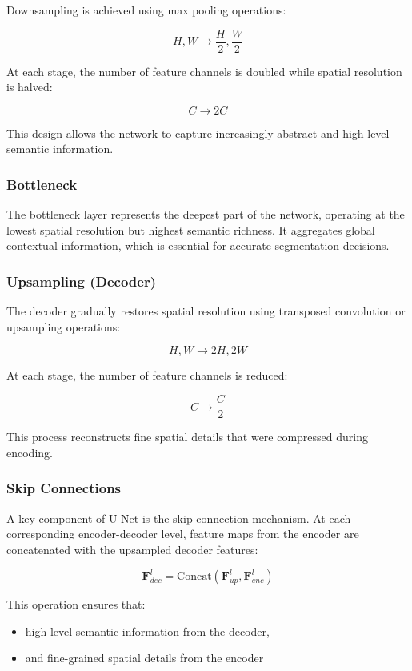 Downsampling is achieved using max pooling operations:

\[
H, W \rightarrow \frac{H}{2}, \frac{W}{2}
\]

At each stage, the number of feature channels is doubled while spatial resolution is halved:

\[
C \rightarrow 2C
\]

This design allows the network to capture increasingly abstract and high-level semantic information.

\subsubsection{Bottleneck}

The bottleneck layer represents the deepest part of the network, operating at the lowest spatial resolution but highest semantic richness. It aggregates global contextual information, which is essential for accurate segmentation decisions.

\subsubsection{Upsampling (Decoder)}

The decoder gradually restores spatial resolution using transposed convolution or upsampling operations:

\[
H, W \rightarrow 2H, 2W
\]

At each stage, the number of feature channels is reduced:

\[
C \rightarrow \frac{C}{2}
\]

This process reconstructs fine spatial details that were compressed during encoding.

\subsubsection{Skip Connections}

A key component of U-Net is the skip connection mechanism. At each corresponding encoder-decoder level, feature maps from the encoder are concatenated with the upsampled decoder features:

\[
\mathbf{F}_{dec}^{l} = \text{Concat}(\mathbf{F}_{up}^{l}, \mathbf{F}_{enc}^{l})
\]

This operation ensures that:

\begin{itemize}
    \item high-level semantic information from the decoder,
    \item and fine-grained spatial details from the encoder
\end{itemize}

